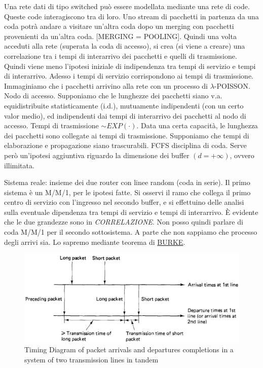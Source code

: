 Una rete dati di tipo switched può essere modellata mediante una rete di code. Queste code interagiscono tra di loro. Uno stream di pacchetti in partenza da una coda potrà andare a visitare un'altra coda dopo un merging con pacchetti provenienti da un'altra coda. [MERGING = POOLING]. Quindi una volta acceduti alla rete (superata la coda di accesso), si crea (si viene a creare) una correlazione tra i tempi di interarrivo dei pacchetti e quelli di trasmissione. Quindi viene meno l'ipotesi iniziale di indipendenza tra tempi di servizio e tempi di interarrivo. Adesso i tempi di servizio corrispondono ai tempi di trasmissione. Immaginiamo che i pacchetti arrivino alla rete con un processo di $\lambda$-POISSON. Nodo di accesso. Supponiamo che le lunghezze dei pacchetti siano v.a. equidistribuite statisticamente (i.d.), mutuamente indipendenti (con un certo valor medio), ed indipendenti dai tempi di interarrivo dei pacchetti al nodo di accesso. Tempi di trasmissione $\sim EXP(\mathord{\cdot})$. Data una certa capacità, le lunghezza dei pacchetti sono collegate ai tempi di trasmissione. Supponiamo che tempi di elaborazione e propagazione siano trascurabili. FCFS disciplina di coda. Serve però un'ipotesi aggiuntiva riguardo la dimensione dei buffer $(d=+\infty)$, ovvero illimitata.

Sistema reale: insieme dei due router con linee random (coda in serie). Il primo sistema è un M/M/1, per le ipotesi fatte. Si osservi il ramo che collega il primo centro di servizio con l'ingresso nel secondo buffer, e si effettuino delle analisi sulla eventuale dipendenza tra tempi di servizio e tempi di interarrivo. \`E evidente che le due grandezze sono in \textit{CORRELAZIONE}. Non posso quindi parlare di coda M/M/1 per il secondo sottosistema. A parte che non sappiamo che processo degli arrivi sia. Lo sapremo mediante teorema di \underline{BURKE}.

\begin{center}
\begin{figure}[H]
\centering
\includegraphics[scale=1]{figures/klnrk.png}
\caption{Timing Diagram of packet arrivals and departures completions in a system of two transmission lines in tandem} 
\end{figure}
\end{center}


